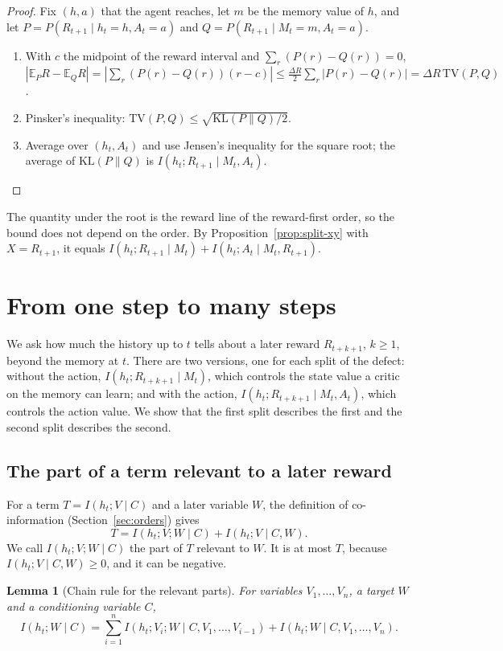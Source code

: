 \documentclass{article}
\newtheorem{lemma}{Lemma}
\theoremstyle{definition}
\theoremstyle{remark}
\newcommand{\E}{\mathbb{E}}
\begin{document}
\begin{proof}
Fix $(h,a)$ that the agent reaches, let $m$ be the memory value of $h$, and let $P=P(R_{t+1}\mid h_t=h,A_t=a)$ and $Q=P(R_{t+1}\mid M_t=m,A_t=a)$.
\begin{enumerate}
\item With $c$ the midpoint of the reward interval and $\sum_r(P(r)-Q(r))=0$,
$|\E_PR-\E_QR|=|\sum_r(P(r)-Q(r))(r-c)|\le\frac{\Delta R}2\sum_r|P(r)-Q(r)|=\Delta R\,\mathrm{TV}(P,Q)$.
\item Pinsker's inequality: $\mathrm{TV}(P,Q)\le\sqrt{\mathrm{KL}(P\|Q)/2}$.
\item Average over $(h_t,A_t)$ and use Jensen's inequality for the square root; the average of $\mathrm{KL}(P\|Q)$ is $I(h_t;R_{t+1}\mid M_t,A_t)$.
\end{enumerate}
\end{proof}

The quantity under the root is the reward line of the reward-first order, so the bound does not depend on the order. By Proposition~\ref{prop:split-xy} with $X=R_{t+1}$, it equals $I(h_t;R_{t+1}\mid M_t)+I(h_t;A_t\mid M_t,R_{t+1})$.

\section{From one step to many steps}

We ask how much the history up to $t$ tells about a later reward $R_{t+k+1}$, $k\ge1$, beyond the memory at $t$. There are two versions, one for each split of the defect: without the action, $I(h_t;R_{t+k+1}\mid M_t)$, which controls the state value a critic on the memory can learn; and with the action, $I(h_t;R_{t+k+1}\mid M_t,A_t)$, which controls the action value. We show that the first split describes the first and the second split describes the second.

\subsection{The part of a term relevant to a later reward}

For a term $T=I(h_t;V\mid C)$ and a later variable $W$, the definition of co-information (Section~\ref{sec:orders}) gives
\[
T=I(h_t;V;W\mid C)+I(h_t;V\mid C,W).
\]
We call $I(h_t;V;W\mid C)$ the part of $T$ relevant to $W$. It is at most $T$, because $I(h_t;V\mid C,W)\ge0$, and it can be negative.

\begin{lemma}[Chain rule for the relevant parts]\label{lem:relevant}
For variables $V_1,\dots,V_n$, a target $W$ and a conditioning variable $C$,
\[
I(h_t;W\mid C)=\sum_{i=1}^{n}I(h_t;V_i;W\mid C,V_1,\dots,V_{i-1})+I(h_t;W\mid C,V_1,\dots,V_n).
\]
\end{lemma}
\end{document}
